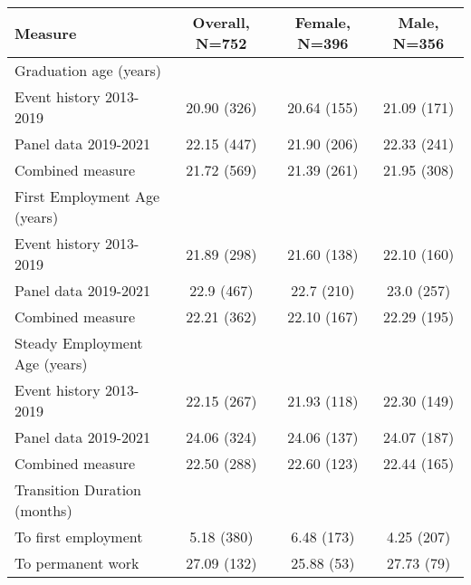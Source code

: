 \begin{longtable}{lccc}
\toprule
\textbf{Measure} & \textbf{Overall}, N=752 & \textbf{Female}, N=396 & \textbf{Male}, N=356 \\ 
\midrule
\multicolumn{1}{l}{Graduation age (years)} \\ 
\midrule
Event history 2013-2019 & 20.90 (326) & 20.64 (155) & 21.09 (171) \\ 
Panel data 2019-2021 & 22.15 (447) & 21.90 (206) & 22.33 (241) \\ 
Combined measure & 21.72 (569) & 21.39 (261) & 21.95 (308) \\ 
\midrule
\multicolumn{1}{l}{First Employment Age (years)} \\ 
\midrule
Event history 2013-2019 & 21.89 (298) & 21.60 (138) & 22.10 (160) \\  
Panel data 2019-2021 & 22.9 (467) & 22.7 (210) & 23.0 (257) \\ 
Combined measure & 22.21 (362) & 22.10 (167) & 22.29 (195) \\
\midrule
\multicolumn{1}{l}{Steady Employment Age (years)} \\ 
\midrule
Event history 2013-2019 & 22.15 (267) & 21.93 (118) & 22.30 (149) \\ 
Panel data 2019-2021 & 24.06 (324) & 24.06 (137) & 24.07 (187) \\
Combined measure & 22.50 (288) & 22.60 (123) & 22.44 (165) \\ 
\midrule
\multicolumn{1}{l}{Transition Duration (months)} \\ 
\midrule
To first employment & 5.18 (380) & 6.48 (173) & 4.25 (207) \\ 
To permanent work & 27.09 (132) & 25.88 (53) & 27.73 (79) \\ 
\bottomrule
\end{longtable}